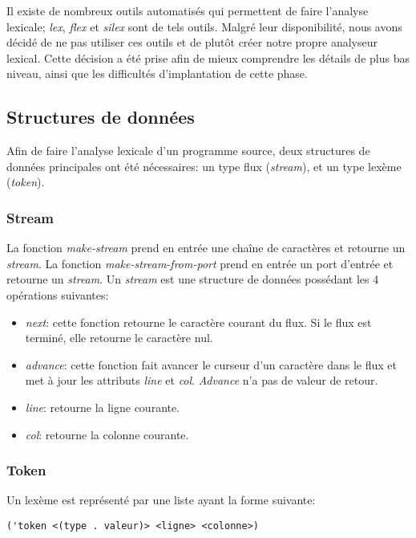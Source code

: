 \documentclass[11pt]{report}
\begin{document}
Il existe de nombreux outils automatisés qui permettent de faire
l'analyse lexicale; \emph{lex}, \emph{flex} et \emph{silex} sont de
tels outils.  Malgré leur disponibilité, nous avons décidé de ne pas
utiliser ces outils et de plutôt créer notre propre analyseur lexical.
Cette décision a été prise afin de mieux comprendre les détails de
plus bas niveau, ainsi que les difficultés d'implantation de cette
phase.

\subsection{Structures de données}

Afin de faire l'analyse lexicale d'un programme source, deux
structures de données principales ont été nécessaires: un type flux
(\emph{stream}), et un type lexème (\emph{token}).

\subsubsection{Stream}

La fonction \emph{make-stream} prend en entrée une chaîne de
caractères et retourne un \emph{stream}.  La fonction
\emph{make-stream-from-port} prend en entrée un port d'entrée et
retourne un \emph{stream}.  Un \emph{stream} est une structure de
données possédant les 4 opérations suivantes:

\begin{itemize}
\item \emph{next}: cette fonction retourne le caractère courant du
  flux.  Si le flux est terminé, elle retourne le caractère nul.
\item \emph{advance}: cette fonction fait avancer le curseur d'un
  caractère dans le flux et met à jour les attributs \emph{line} et
  \emph{col}.  \emph{Advance} n'a pas de valeur de retour.
\item \emph{line}: retourne la ligne courante.
\item \emph{col}: retourne la colonne courante.
\end{itemize}


\subsubsection{Token}

Un lexème est représenté par une liste ayant la forme suivante:

\begin{verbatim}
('token <(type . valeur)> <ligne> <colonne>)
\end{verbatim}
\end{document}
